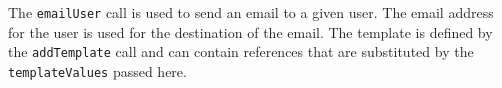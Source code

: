 The \verb+emailUser+ call is used to send an email to a given user. The email address for the user is used for the
destination of the email. The template is defined by the \verb+addTemplate+ call and can contain references that are substituted by
the \verb+templateValues+ passed here.
